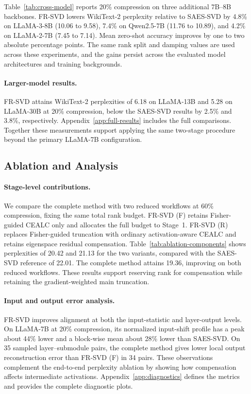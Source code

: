 \documentclass[11pt]{article}
\begin{document}
Table~\ref{tab:cross-model} reports 20\% compression on three additional 7B--8B backbones. FR-SVD lowers WikiText-2 perplexity relative to SAES-SVD by 4.8\% on LLaMA-3-8B (10.06 to 9.58), 7.4\% on Qwen2.5-7B (11.76 to 10.89), and 4.2\% on LLaMA-2-7B (7.45 to 7.14). Mean zero-shot accuracy improves by one to two absolute percentage points. The same rank split and damping values are used across these experiments, and the gains persist across the evaluated model architectures and training backgrounds.


\paragraph{Larger-model results.}
FR-SVD attains WikiText-2 perplexities of 6.18 on LLaMA-13B and 5.28 on LLaMA-30B at 20\% compression, below the SAES-SVD results by 2.5\% and 3.8\%, respectively. Appendix~\ref{app:full-results} includes the full comparisons. Together these measurements support applying the same two-stage procedure beyond the primary LLaMA-7B configuration.

\subsection{Ablation and Analysis}\label{sec:ablation}

\paragraph{Stage-level contributions.}

We compare the complete method with two reduced workflows at 60\% compression, fixing the same total rank budget. FR-SVD (F) retains Fisher-guided CEALC only and allocates the full budget to Stage~1. FR-SVD (R) replaces Fisher-guided truncation with ordinary activation-aware CEALC and retains eigenspace residual compensation. Table~\ref{tab:ablation-components} shows perplexities of 20.42 and 21.13 for the two variants, compared with the SAES-SVD reference of 22.01. The complete method attains 19.36, improving on both reduced workflows. These results support reserving rank for compensation while retaining the gradient-weighted main truncation.



\paragraph{Input and output error analysis.}
FR-SVD improves alignment at both the input-statistic and layer-output levels. On LLaMA-7B at 20\% compression, its normalized input-shift profile has a peak about 44\% lower and a block-wise mean about 28\% lower than SAES-SVD. On 35 sampled layer--submodule pairs, the complete method gives lower local output reconstruction error than FR-SVD (F) in 34 pairs. These observations complement the end-to-end perplexity ablation by showing how compensation affects intermediate activations. Appendix~\ref{app:diagnostics} defines the metrics and provides the complete diagnostic plots.
\end{document}
